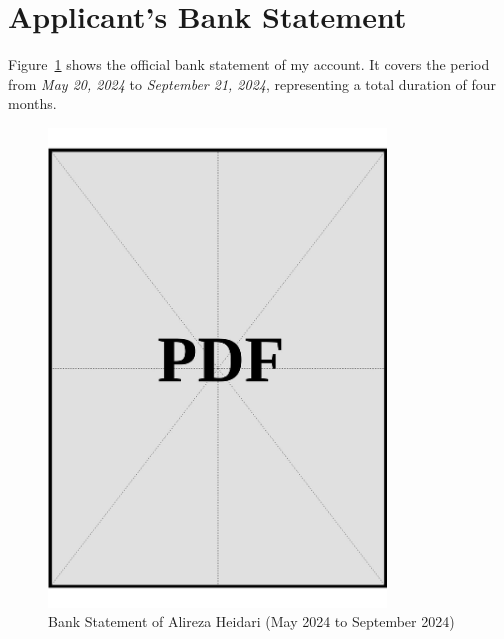 \clearpage

\section{Applicant's Bank Statement}
\label{sec:applicant-bank-statement}

\noindent
Figure~\ref{fig:applicant-bank-statement} shows the official bank statement of my account. It covers the period from \textit{May 20, 2024} to \textit{September 21, 2024}, representing a total duration of four months.

\vspace*{\fill}
\begin{figure}[h]
    \centering
    \includegraphics[page=1, width=0.8\textwidth]{../application-docs/applicant/funds/bank-account/bank-statement.pdf}
    \caption{Bank Statement of Alireza Heidari (May 2024 to September 2024)}
    \label{fig:applicant-bank-statement}
\end{figure}
\vspace*{\fill}

\clearpage
